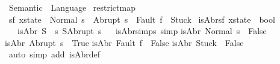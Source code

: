 %
\begin{isabellebody}%
%
%
\isamarkuptrue%
%
\isadelimtheory
%
\endisadelimtheory
%
\isatagtheory
{}\isamarkupfalse%
\ Semantic\ \ Language\ %
\endisatagtheory
{\isafoldtheory}%
%
\isadelimtheory
%
\endisadelimtheory
\isanewline
\isanewline
{}\isamarkupfalse%
\isanewline
restrict{\isacharunderscore}map\ \ {\isacharparenleft}{\isachardoublequoteopen}{\isacharunderscore}{\isacharbar}\isactrlbsub {\isacharunderscore}\isactrlesub {\isachardoublequoteclose}\ {\isacharbrackleft}{}{}{\isacharcomma}\ {}{}{\isacharbrackright}\ {}{}{\isacharparenright}\isanewline
\isanewline
\isanewline
{}\isamarkupfalse%
\ {\isacharparenleft}{\isacharprime}s{\isacharcomma}{\isacharprime}f{\isacharparenright}\ xstate\ {\isacharequal}\ Normal\ {\isacharprime}s\ {\isacharbar}\ Abrupt\ {\isacharprime}s\ {\isacharbar}\ Fault\ {\isacharprime}f\ {\isacharbar}\ Stuck\isanewline
\isanewline
{}\isamarkupfalse%
\ isAbr{\isacharcolon}{\isacharcolon}{\isachardoublequoteopen}{\isacharparenleft}{\isacharprime}s{\isacharcomma}{\isacharprime}f{\isacharparenright}\ xstate\ {\isasymRightarrow}\ bool{\isachardoublequoteclose}\isanewline
\ \ \ {\isachardoublequoteopen}isAbr\ S\ {\isacharequal}\ {\isacharparenleft}{\isasymexists}s{\isachardot}\ S{\isacharequal}Abrupt\ s{\isacharparenright}{\isachardoublequoteclose}\isanewline
\ \isanewline
{}\isamarkupfalse%
\ isAbr{\isacharunderscore}simps\ {\isacharbrackleft}simp{\isacharbrackright}{\isacharcolon}\isanewline
{\isachardoublequoteopen}isAbr\ {\isacharparenleft}Normal\ s{\isacharparenright}\ {\isacharequal}\ False{\isachardoublequoteclose}\isanewline
{\isachardoublequoteopen}isAbr\ {\isacharparenleft}Abrupt\ s{\isacharparenright}\ {\isacharequal}\ True{\isachardoublequoteclose}\isanewline
{\isachardoublequoteopen}isAbr\ {\isacharparenleft}Fault\ f{\isacharparenright}\ {\isacharequal}\ False{\isachardoublequoteclose}\isanewline
{\isachardoublequoteopen}isAbr\ Stuck\ {\isacharequal}\ False{\isachardoublequoteclose}\isanewline
%
\isadelimproof
%
\endisadelimproof
%
\isatagproof
{}\isamarkupfalse%
\ {\isacharparenleft}auto\ simp\ add{\isacharcolon}\ isAbr{\isacharunderscore}def{\isacharparenright}%
\endisatagproof
{\isafoldproof}%
%
\isadelimproof
\isanewline
%
\endisadelimproof
\isanewline
{}\isamarkupfalse%

\end{isabellebody}
